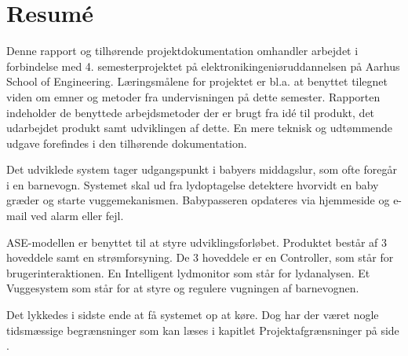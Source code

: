 \chapter{Resumé}

Denne rapport og tilhørende projektdokumentation omhandler arbejdet i forbindelse med 4. semesterprojektet på elektronikingeniøruddannelsen på Aarhus School of Engineering. Læringsmålene for projektet er bl.a. at benyttet tilegnet viden om emner og metoder fra undervisningen på dette semester. Rapporten indeholder de benyttede arbejdsmetoder der er brugt fra idé til produkt, det udarbejdet produkt samt udviklingen af dette. En mere teknisk og udtømmende udgave forefindes i den tilhørende dokumentation. 

Det udviklede system tager udgangspunkt i babyers middagslur, som ofte foregår i en barnevogn. Systemet skal ud fra lydoptagelse detektere hvorvidt en baby græder og starte vuggemekanismen. Babypasseren opdateres via hjemmeside og e-mail ved alarm eller fejl.

ASE-modellen er benyttet til at styre udviklingsforløbet. Produktet består af 3 hoveddele samt en strømforsyning. De 3 hoveddele er en Controller, som står for brugerinteraktionen. En Intelligent lydmonitor som står for lydanalysen. Et Vuggesystem som står for at styre og regulere vugningen af barnevognen. 

Det lykkedes i sidste ende at få systemet op at køre. Dog har der været nogle tidsmæssige begrænsninger som kan læses i kapitlet Projektafgrænsninger på side \pageref{projektafgraensninger}.